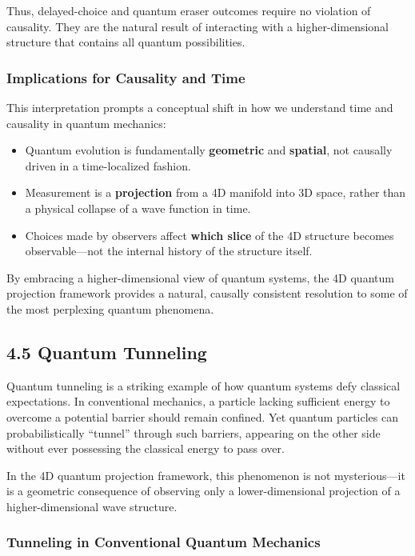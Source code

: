 \documentclass[12pt]{article}
\begin{document}
Thus, delayed-choice and quantum eraser outcomes require no violation of causality. They are the natural result of interacting with a higher-dimensional structure that contains all quantum possibilities.

\subsubsection{Implications for Causality and Time}

This interpretation prompts a conceptual shift in how we understand time and causality in quantum mechanics:
\begin{itemize}
  \item Quantum evolution is fundamentally \textbf{geometric} and \textbf{spatial}, not causally driven in a time-localized fashion.
  \item Measurement is a \textbf{projection} from a 4D manifold into 3D space, rather than a physical collapse of a wave function in time.
  \item Choices made by observers affect \textbf{which slice} of the 4D structure becomes observable—not the internal history of the structure itself.
\end{itemize}

By embracing a higher-dimensional view of quantum systems, the 4D quantum projection framework provides a natural, causally consistent resolution to some of the most perplexing quantum phenomena.

\subsection{4.5 Quantum Tunneling}

Quantum tunneling is a striking example of how quantum systems defy classical expectations. In conventional mechanics, a particle lacking sufficient energy to overcome a potential barrier should remain confined. Yet quantum particles can probabilistically “tunnel” through such barriers, appearing on the other side without ever possessing the classical energy to pass over.

In the 4D quantum projection framework, this phenomenon is not mysterious—it is a geometric consequence of observing only a lower-dimensional projection of a higher-dimensional wave structure.

\subsubsection{Tunneling in Conventional Quantum Mechanics}
\end{document}
